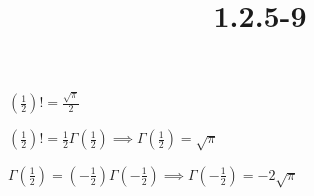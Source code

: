\documentclass{article}
\title{1.2.5-9}
\begin{document}
\maketitle

\( (\frac{1}{2})! = \frac{\sqrt{\pi}}{2} \)

\( (\frac{1}{2})! = \frac{1}{2} \Gamma(\frac{1}{2}) \implies \Gamma(\frac{1}{2}) = \sqrt{\pi} \)

\( \Gamma(\frac{1}{2}) = (-\frac{1}{2})\Gamma(-\frac{1}{2}) \implies \Gamma(-\frac{1}{2}) = -2\sqrt{\pi} \)
\end{document}
